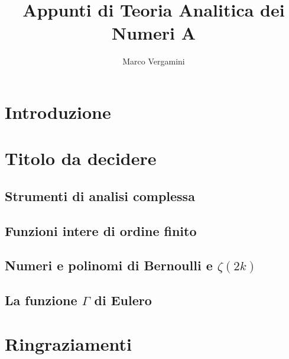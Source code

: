 \documentclass{article}
\title{Appunti di Teoria Analitica dei Numeri A}
\date{}
\author{Marco Vergamini}
\begin{document}
\maketitle
\newpage
\tableofcontents
\newpage


\section*{Introduzione}


\newpage

\section{Titolo da decidere}

\subsection{Strumenti di analisi complessa}


\subsection{Funzioni intere di ordine finito}



\subsection{Numeri e polinomi di Bernoulli e $\zeta(2k)$}


\subsection{La funzione $\Gamma$ di Eulero}


\newpage



\section*{Ringraziamenti}

\end{document}
